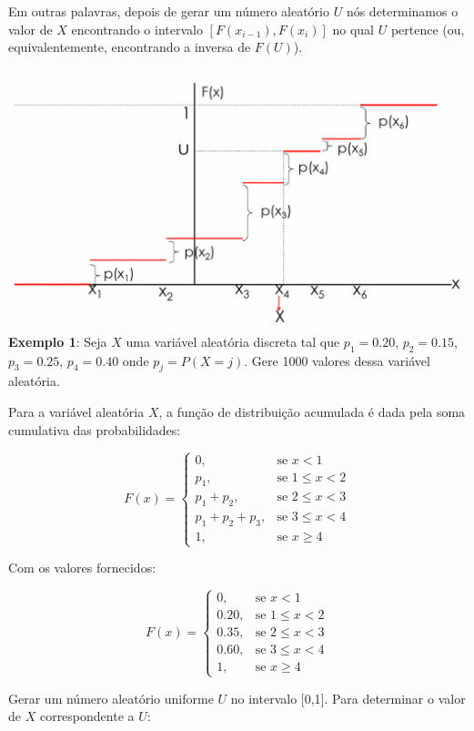 \documentclass[
]{book}
\begin{document}
Em outras palavras, depois de gerar um número aleatório \(U\) nós
determinamos o valor de \(X\) encontrando o intervalo
\([F(x_{i-1}),F(x_{i})]\) no qual \(U\) pertence (ou, equivalentemente,
encontrando a inversa de \(F(U)\)).

\includegraphics{docs/transf_inversa1.png} \textbf{Exemplo 1}: Seja \(X\) uma variável
aleatória discreta tal que \(p_{1}=0.20\), \(p_{2}=0.15\), \(p_{3}=0.25\),
\(p_{4}=0.40\) onde \(p_{j}=P(X=j)\). Gere 1000 valores dessa variável
aleatória.

Para a variável aleatória \(X\), a função de distribuição acumulada é dada
pela soma cumulativa das probabilidades:

\[
F(x) = 
\begin{cases} 
0, & \text{se } x < 1 \\
p_1, & \text{se } 1 \leq x < 2 \\
p_1 + p_2, & \text{se } 2 \leq x < 3 \\
p_1 + p_2 + p_3, & \text{se } 3 \leq x < 4 \\
1, & \text{se } x \geq 4 
\end{cases}
\]

Com os valores fornecidos:

\[
F(x) = 
\begin{cases} 
0, & \text{se } x < 1 \\
0.20, & \text{se } 1 \leq x < 2 \\
0.35, & \text{se } 2 \leq x < 3 \\
0.60, & \text{se } 3 \leq x < 4 \\
1, & \text{se } x \geq 4 
\end{cases}
\]

Gerar um número aleatório uniforme \(U\) no intervalo {[}0,1{]}. Para
determinar o valor de \(X\) correspondente a \(U\):
\end{document}
